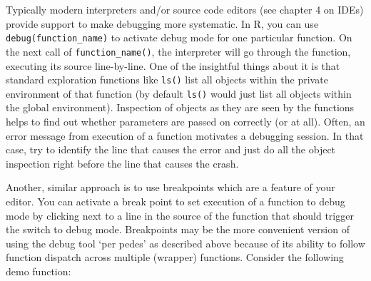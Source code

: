 \documentclass[
  12pt,
  letterpaper,
]{krantz}
\newenvironment{Shaded}{\begin{snugshade}}{\end{snugshade}}
\newcommand{\ControlFlowTok}[1]{\textcolor[rgb]{0.00,0.23,0.31}{#1}}
\newcommand{\DecValTok}[1]{\textcolor[rgb]{0.68,0.00,0.00}{#1}}
\newcommand{\FunctionTok}[1]{\textcolor[rgb]{0.28,0.35,0.67}{#1}}
\newcommand{\NormalTok}[1]{\textcolor[rgb]{0.00,0.23,0.31}{#1}}
\newcommand{\OtherTok}[1]{\textcolor[rgb]{0.00,0.23,0.31}{#1}}
\newcommand{\SpecialCharTok}[1]{\textcolor[rgb]{0.37,0.37,0.37}{#1}}
\begin{document}
Typically modern interpreters and/or source code editors (see chapter 4
on IDEs) provide support to make debugging more systematic. In R, you
can use \texttt{debug(function\_name)} to activate debug mode for one
particular function. On the next call of \texttt{function\_name()}, the
interpreter will go through the function, executing its source
line-by-line. One of the insightful things about it is that standard
exploration functions like \texttt{ls()} list all objects within the
private environment of that function (by default \texttt{ls()} would
just list all objects within the global environment). Inspection of
objects as they are seen by the functions helps to find out whether
parameters are passed on correctly (or at all). Often, an error message
from execution of a function motivates a debugging session. In that
case, try to identify the line that causes the error and just do all the
object inspection right before the line that causes the crash.

Another, similar approach is to use breakpoints which are a feature of
your editor. You can activate a break point to set execution of a
function to debug mode by clicking next to a line in the source of the
function that should trigger the switch to debug mode. Breakpoints may
be the more convenient version of using the debug tool `per pedes' as
described above because of its ability to follow function dispatch
across multiple (wrapper) functions. Consider the following demo
function:

\begin{Shaded}
\end{Shaded}
\end{document}
